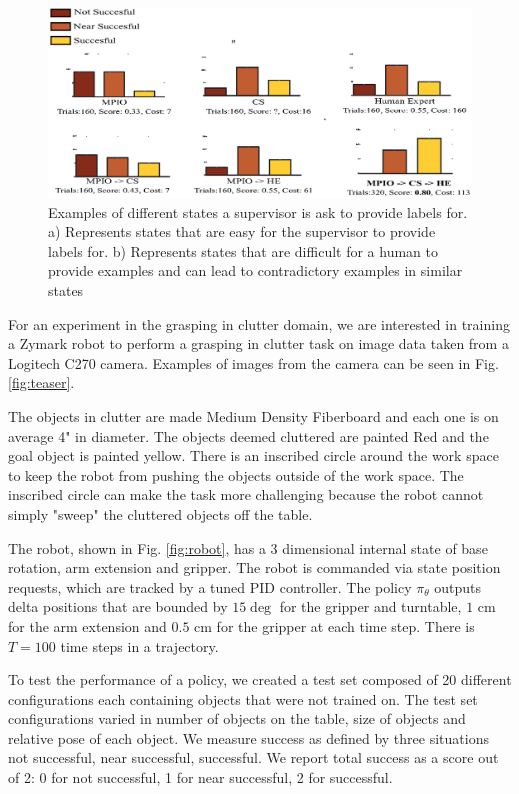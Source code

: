 \documentclass[10pt, conference]{ieeeconf}      %
\begin{document}
\begin{figure}[t]
\centering

\includegraphics{f_figs/results.eps}

\caption{\footnotesize  Examples of different states a supervisor is ask to provide labels for. a) Represents states that are easy for the supervisor to provide labels for.  b) Represents states that are difficult for a human to provide examples and can lead to contradictory examples in similar states }
\vspace*{-20pt}
\label{fig:perf_results}
\end{figure}


For an experiment in the grasping in clutter domain, we are interested in training a Zymark robot to perform a grasping in clutter task on image data taken from a Logitech C270 camera. Examples of images from the camera can be seen in Fig. \ref{fig:teaser}.

The objects in clutter are made Medium Density Fiberboard and each one is on average 4" in diameter. The objects deemed cluttered are painted Red and the goal object is painted yellow. There is an inscribed circle around the work space to keep the robot from pushing the objects outside of the work space. The inscribed circle can make the task more challenging because the robot cannot simply "sweep" the cluttered objects off the table. 

The robot, shown in Fig. \ref{fig:robot}, has a 3 dimensional internal state of base rotation, arm extension and gripper. The robot is commanded via state position requests, which are tracked by a tuned PID controller. The policy $\pi_\theta$ outputs delta positions that are bounded by $15\deg$ for the gripper and turntable, $1$ cm for the arm extension and $0.5$ cm for the gripper at each time step. There is $T=100$ time steps in a trajectory. 

To test the performance of a policy, we created a test set composed of 20 different configurations each containing objects that were not trained on.  The test set configurations varied in number of objects on the table, size of objects and relative pose of each object. We measure success as defined by three situations not successful, near successful, successful. We report total success as a score out of 2: 0 for not successful, 1 for near successful, 2 for successful.
\end{document}
